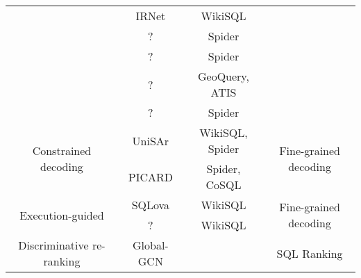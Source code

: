 \begin{table}
\begin{tabular}{|c|c|c|c|}
                                                                   & IRNet               & WikiSQL                   &                                                                                          \\
                                                                   & ?                   & Spider                    &                                                                                          \\
                                                                   & ?                   & Spider                    &                                                                                          \\  & ?                   & GeoQuery, ATIS
                                                                   &                                                                                                                                            \\  & ?                   & Spider                    &                                                        \\
        \hline
        \multirow{2}{*}{Constrained decoding}                      & UniSAr              & WikiSQL, Spider           & \multirow{2}{*}{Fine-grained decoding}                                                   \\
                                                                   & PICARD              & Spider, CoSQL
                                                                   &                                                                                                                                            \\
        \hline
        \multirow{2}{*}{Execution-guided}                          & SQLova              & WikiSQL                   & \multirow{2}{*}{Fine-grained decoding}                                                   \\
                                                                   & ?                   & WikiSQL
                                                                   &                                                                                                                                            \\
        \hline
        \multirow{2}{*}{Discriminative re-ranking}                 & Global-GCN          &                           & \multirow{2}{*}{SQL Ranking
        }                                                                                                                                                                                                       \\

\end{tabular}
\end{table}
